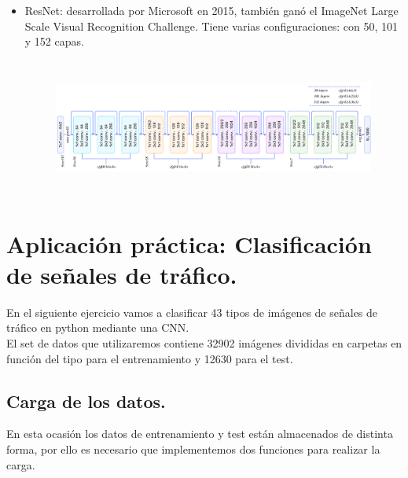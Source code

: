 \documentclass[a4paper,10pt]{article}
\begin{document}
\begin{itemize}
\begin{figure}[H]
\end{figure} 	
\item ResNet: desarrollada por Microsoft en 2015, también ganó el ImageNet Large Scale Visual Recognition Challenge. Tiene varias configuraciones: con 50, 101 y 152 capas.\begin{figure}[H]
\centering
\includegraphics[width=12.0cm, height=4.5cm]{resnet.png}
\end{figure} 	
\end{itemize}

\newpage

\section{Aplicación práctica: Clasificación de señales de tráfico.}
En el siguiente ejercicio vamos a clasificar 43 tipos de imágenes de señales de tráfico en python mediante una CNN. \\
El set de datos que utilizaremos contiene 32902 imágenes divididas en carpetas en función del tipo para el entrenamiento y 12630 para el test.
\subsection{Carga de los datos.}
En esta ocasión los datos de entrenamiento y test están almacenados de distinta forma, por ello es necesario que implementemos dos funciones para realizar la carga.
\end{document}
